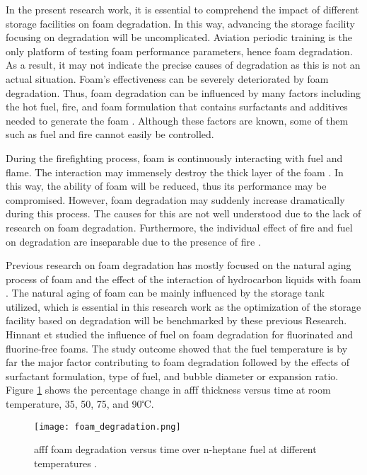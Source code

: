 In the present research work, it is essential to comprehend the impact of different storage facilities on foam degradation. In this way, advancing the storage facility focusing on degradation will be uncomplicated. Aviation periodic training is the only platform of testing foam performance parameters, hence foam degradation. As a result, it may not indicate the precise causes of degradation as this is not an actual situation. Foam's effectiveness can be severely deteriorated by foam degradation. Thus, foam degradation can be influenced by many factors including the hot fuel, fire, and foam formulation that contains surfactants and additives needed to generate the foam \cite{hinnant2017influence}. Although these factors are known, some of them such as fuel and fire cannot easily be controlled.    

During the firefighting process, foam is continuously interacting with fuel and flame. The interaction may immensely destroy the thick layer of the foam \cite{osei2015foam}. In this way, the ability of foam will be reduced, thus its performance may be compromised. However, foam degradation may suddenly increase dramatically during this process.  The causes for this are not well understood due to the lack of research on foam degradation. Furthermore, the individual effect of fire and fuel on degradation are inseparable due to the presence of fire \cite{hinnant2017influence}. 

Previous research on foam degradation has mostly focused on the natural aging process of foam \cite{do2011numerical} and the effect of the interaction of hydrocarbon liquids with foam \cite{osei2015foam}.  The natural aging of foam can be mainly influenced by the storage tank utilized, which is essential in this research work as the optimization of the storage facility based on degradation will be benchmarked by these previous Research. Hinnant et \cite{hinnant2017influence} studied the influence of fuel on foam degradation for fluorinated and fluorine-free foams. The study outcome showed that the fuel temperature is by far the major factor contributing to foam degradation followed by the effects of surfactant formulation, type of fuel, and bubble diameter or expansion ratio. Figure \ref{ch2:figure:degradation} shows the percentage change in \acrshort{afff} thickness versus time at room temperature, 35, 50, 75, and 90℃.

\begin{figure}[H]
    \texttt{[image: foam\_degradation.png]}
    \caption{\acrshort{afff} foam degradation versus time over n-heptane fuel at different temperatures \cite{hinnant2017influence}.}
    \label{ch2:figure:degradation}
\end{figure}

